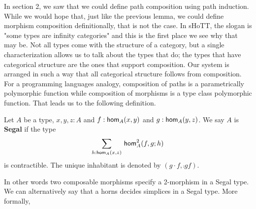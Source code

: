 \documentclass[main.tex]{subfiles}
\begin{document}
In section 2, we saw that we could define path composition using path induction. While we would hope that, just like the previous lemma,
we could define morphism composition definitionally, that is not the case. In sHoTT,
the slogan is "some types are infinity categories" and this is the first place we see why that may be. Not all types come with the
structure of a category, but a single characterization allows us to talk about the types that do; the types that have categorical structure
are the ones that support composition. Our system is arranged in such a way that all categorical structure follows from composition.
For a programming languages analogy, composition of paths is a parametrically polymorphic 
function while composition of morphisms is a type class polymorphic function. That leads us to the following definition.
\begin{definition}\label{def:def3.3}
    Let $A$ be a type, $x,y,z : A$ and $f : \ho[A]{x}{y}$ and $g : \ho[A]{y}{z}$. We say $A$ is \textbf{Segal} if the type $${\sm{h : \ho[A]{x}{z}} \hot[A]{f}{g}{h}} $$
    is contractible. The unique inhabitant is denoted by $(g\cdot f, \comp{g}{f}).$
\end{definition}

In other words two composable morphisms specify a 2-morphism in a Segal type. We can alternatively say that a horns
decides simplices in a Segal type. More formally,
\end{document}
